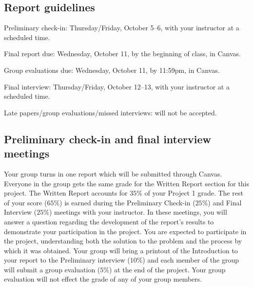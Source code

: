 \documentclass[11pt]{article}
\begin{document}


\subsection*{Report guidelines}
\vspace{-2.8ex}


\begin{compactdesc}
    \item[Preliminary check-in:] Thursday/Friday, October 5--6, with your
    instructor at a scheduled time.
    \item[Final report due:] Wednesday, October 11, by the beginning of
    class, in Canvas.
    \item[Group evaluations due:] Wednesday, October 11, by 11:59pm, in
    Canvas.
    \item[Final interview:] Thursday/Friday, October 12--13, with your
    instructor at a scheduled time.
    \item[Late papers/group evaluations/missed interviews:] will not be accepted.
\end{compactdesc}

\subsection*{Preliminary check-in and final interview meetings}
\vspace{-2.8ex}

Your group turns in one report which will be submitted through Canvas.
Everyone in the group gets the same grade for the Written Report section for
this project. The Written Report accounts for $35\%$ of your Project 1 grade.
The rest of your score ($65\%$) is earned during the Preliminary Check-in
($25\%$) and Final Interview ($25\%$) meetings with your instructor. In these
meetings, you will answer a question regarding the development of the report's
results to demonstrate your participation in the project. You are expected to
participate in the project, understanding both the solution to the problem and
the process by which it was obtained. Your group will bring a printout of the
Introduction to your report to the Preliminary interview ($10\%$) and each
member of the group will submit a group evaluation ($5\%$) at the end of the
project. Your group evaluation will not effect the grade of any of your group
members.
\end{document}
